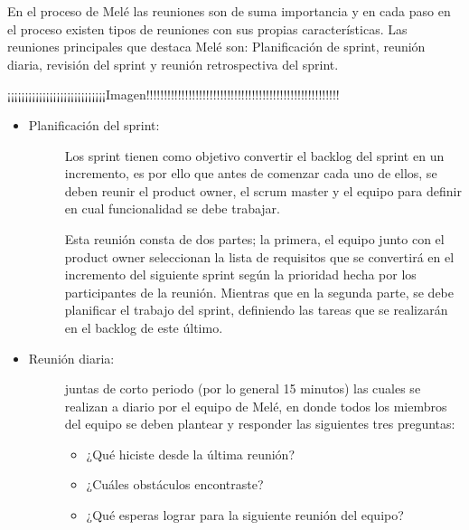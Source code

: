 En el proceso de Melé las reuniones son de suma importancia y en cada paso en el proceso existen tipos de reuniones con sus propias características. Las reuniones principales que destaca Melé son: Planificación de sprint, reunión diaria, revisión del sprint y reunión retrospectiva del sprint. 

¡¡¡¡¡¡¡¡¡¡¡¡¡¡¡¡¡¡¡¡¡¡¡¡¡¡¡¡Imagen!!!!!!!!!!!!!!!!!!!!!!!!!!!!!!!!!!!!!!!!!!!!!!!!!!!!!!!

\begin{itemize}
    \item   \begin{description}
                \item[Planificación del sprint: ] Los sprint tienen como objetivo convertir el backlog del sprint en un incremento, es por ello que antes de comenzar cada uno de ellos, se deben reunir el product owner, el scrum master y el equipo para definir en cual funcionalidad se debe trabajar.
                
                Esta reunión consta de dos partes; la primera, el equipo junto con el product owner seleccionan la lista de requisitos que se convertirá en el incremento del siguiente sprint según la prioridad hecha por los participantes de la reunión. Mientras que en la segunda parte, se debe planificar el trabajo del sprint, definiendo las tareas que se realizarán en el backlog de este último.

            \end{description}

    \item   \begin{description}
                \item[Reunión diaria:] juntas de corto periodo (por lo general 15 minutos) las cuales se realizan a diario por el equipo de Melé, en donde todos los miembros del equipo se deben plantear y responder las siguientes tres preguntas:  
                
                \begin{itemize}
                    \item ¿Qué hiciste desde la última reunión?

                    \item ¿Cuáles obstáculos encontraste? 

                    \item ¿Qué esperas lograr para la siguiente reunión del equipo?
                \end{itemize}


\end{description}
\end{itemize}
